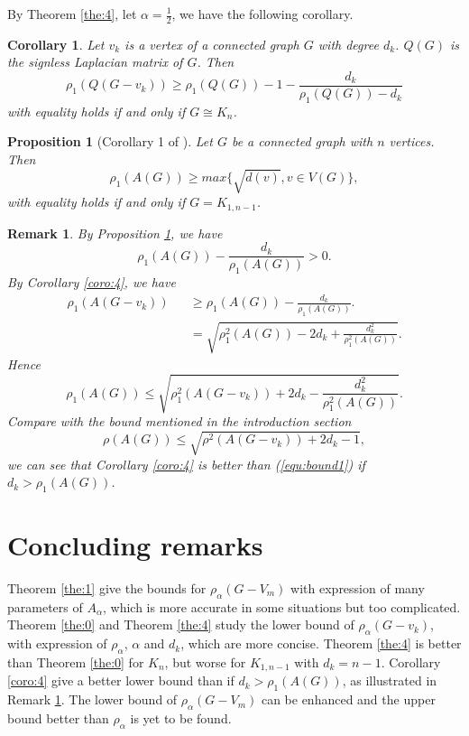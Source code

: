 \documentclass[amsthm]{elsart}
\newtheorem{corollary}{Corollary}[section]
\newtheorem{proposition}{Proposition}[section]
\newtheorem{remark}{Remark}[section]
\begin{document}
By Theorem \ref{the:4}, let $\alpha = \frac{1}{2}$, we have the following corollary.
\begin{corollary} \label{coro:5}
Let $v_k$ is a vertex of a connected graph $G$ with degree $d_k$. $Q(G)$  is the signless Laplacian matrix of $G$. Then
\begin{equation} \label{equ:coro5}
\rho _1 (Q(G - v_k))
  \geqslant \rho _1(Q(G)) - 1 - \frac{d_k}{\rho _1(Q(G)) - d_k}
\end{equation}
with equality holds if and only if $G \cong K_n$.
\end{corollary}


\begin{proposition} [Corollary 1 of \cite{2019Sharp}] \label{prop:remark1}
Let $G$ be a connected graph with $n$ vertices. Then
$$ \rho_1(A(G)) \geqslant max \{ \sqrt{d(v)},  v \in V(G)  \}, $$
with equality holds if and only if $G = K_{1,n-1}$.
\end{proposition}

\begin{remark} \label{remark:1}
By Proposition \ref{prop:remark1}, we have
\begin{equation*}
\rho _1(A(G)) - \frac{d_k}{\rho _1(A(G))} > 0.
\end{equation*}
By Corollary \ref{coro:4}, we have
\begin{eqnarray*}
\rho _1 (A(G - v_k)) 
&& \geqslant \rho _1(A(G)) - \frac{d_k}{\rho _1(A(G))}.
\\ && = \sqrt{\rho _1^2(A(G)) - 2d_k + \frac{d_k^2}{\rho _1^2(A(G))}}.
\end{eqnarray*}
Hence
\begin{equation*}
\rho _1(A(G)) \leqslant \sqrt{\rho _1^2 (A(G - v_k)) + 2 d_k - \frac{d_k^2}{\rho _1^2(A(G))}}.
\end{equation*}
 Compare with the bound \cite{2019A} mentioned in the introduction section
 \begin{equation} \label{equ:bound1}
 \rho(A(G)) \leqslant \sqrt{\rho^2(A(G - v_k)) + 2 d_k - 1},
 \end{equation}
 we can see that Corollary \ref{coro:4} is better than (\ref{equ:bound1}) if $ d_k > \rho _1(A(G))$.
\end{remark}


\section{Concluding remarks}

Theorem \ref{the:1} give the bounds for $\rho_\alpha(G-V_m)$ with expression of many parameters of $A_\alpha$, which is more accurate in some situations but too complicated.
Theorem \ref{the:0} and Theorem \ref{the:4} study the lower bound of $\rho_\alpha(G-v_k)$, with expression of $\rho_\alpha$, $\alpha$ and $d_k$, which are more concise. Theorem \ref{the:4} is better than Theorem \ref{the:0} for $K_n$, but worse for $K_{1,n-1}$ with $d_k= n-1$. 
Corollary \ref{coro:4} give a better lower bound than \cite{2019A} if $ d_k > \rho _1(A(G))$, as illustrated in Remark \ref{remark:1}.
The lower bound of $\rho_\alpha(G-V_m)$ can be enhanced and the upper bound better than $\rho_\alpha$ is yet to be found.
\end{document}
